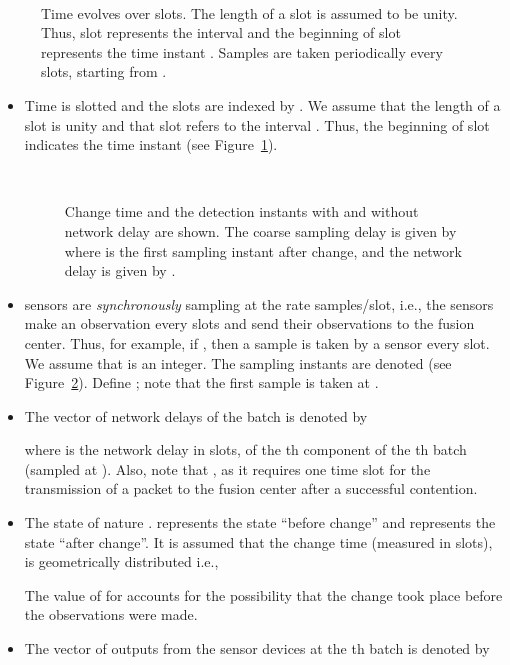 \documentclass[acmtosn]{acmtrans2m}
\begin{document}
 \begin{figure}[t]
   \centering \
   \caption{Time evolves over slots. The length of a 
   slot is assumed to be unity. Thus, slot  represents the interval 
    and the beginning of slot  represents the time instant .
   Samples are taken periodically every  slots, starting from .
   }
   \label{fig:slot-structure}
 \end{figure}

\begin{itemize}
\item[] Time is slotted and the slots are indexed by .
     We assume that the length of a slot is unity and that slot  refers
     to the interval .	Thus, the beginning of slot  indicates the 
     time instant  (see Figure~\ref{fig:slot-structure}).
 \begin{figure}[t]
   \centering \
   \caption{Change time and the detection instants with and without
     network delay are shown. The coarse sampling delay is given by 
      where  is the first sampling instant after change, 
     and the network delay is given by .}
   \label{fig:queueing_decision_instants}
 \end{figure}
\item[]  sensors are \emph{synchronously} sampling at the rate 
  samples/slot, i.e., the sensors make an observation every 
  slots and send their observations to the fusion center. Thus, for
  example, if , then a sample is taken by a sensor every  slot. We
  assume that  is an integer. The sampling instants are denoted
   (see Figure~\ref{fig:queueing_decision_instants}).
  Define ; note that the first sample is taken at .
\item[] The vector of network delays of the batch  is denoted by
  
  where  is the network delay in slots,
  of the th component of the th batch (sampled at ). 
  Also, note that , as it requires one time slot for the 
  transmission of a packet to the fusion center after a successful contention.
\item[] The state of nature .  represents the 
  state {\sf ``before change''} and  represents the state {\sf ``after change''}. 
  It is assumed that 
  the change time  (measured in slots),
  is geometrically distributed i.e.,
   
  The value of  for  accounts for the possibility that the change took 
  place before the observations were made.
\item[] The vector of outputs from the sensor devices at the th
  batch is denoted by
  

\end{itemize}
\end{document}
